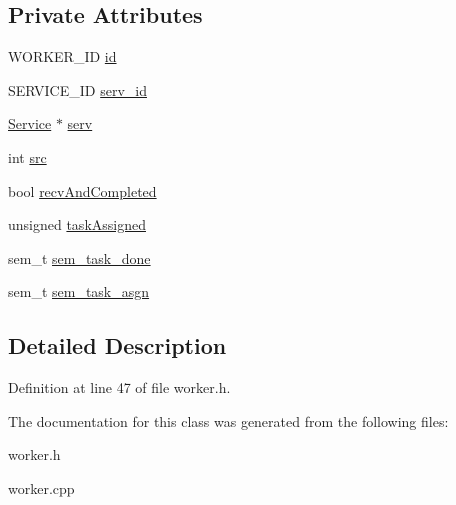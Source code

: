 \subsection*{Private Attributes}
\begin{CompactItemize}
\item 
\hypertarget{classWorker_b5ffcb995e12fa71b9551e91729d6972}{
WORKER\_\-ID \hyperlink{classWorker_b5ffcb995e12fa71b9551e91729d6972}{id}}
\label{classWorker_b5ffcb995e12fa71b9551e91729d6972}

\item 
\hypertarget{classWorker_d7dc76e301fd2bcf5d3a2088a59f1378}{
SERVICE\_\-ID \hyperlink{classWorker_d7dc76e301fd2bcf5d3a2088a59f1378}{serv\_\-id}}
\label{classWorker_d7dc76e301fd2bcf5d3a2088a59f1378}

\item 
\hypertarget{classWorker_454e1764ed165af733cc44a73e395692}{
\hyperlink{classService}{Service} $\ast$ \hyperlink{classWorker_454e1764ed165af733cc44a73e395692}{serv}}
\label{classWorker_454e1764ed165af733cc44a73e395692}

\item 
\hypertarget{classWorker_895c3ebc198018ea3391c09bc802d2f6}{
int \hyperlink{classWorker_895c3ebc198018ea3391c09bc802d2f6}{src}}
\label{classWorker_895c3ebc198018ea3391c09bc802d2f6}

\item 
\hypertarget{classWorker_1bcc1e66cc2021cc9cc5e79d0eea563d}{
bool \hyperlink{classWorker_1bcc1e66cc2021cc9cc5e79d0eea563d}{recv\-And\-Completed}}
\label{classWorker_1bcc1e66cc2021cc9cc5e79d0eea563d}

\item 
\hypertarget{classWorker_3bb2faa8e6350cb0ab13534069dcc96d}{
unsigned \hyperlink{classWorker_3bb2faa8e6350cb0ab13534069dcc96d}{task\-Assigned}}
\label{classWorker_3bb2faa8e6350cb0ab13534069dcc96d}

\item 
\hypertarget{classWorker_173ce84a3c7ee9f73c691c39c68ca711}{
sem\_\-t \hyperlink{classWorker_173ce84a3c7ee9f73c691c39c68ca711}{sem\_\-task\_\-done}}
\label{classWorker_173ce84a3c7ee9f73c691c39c68ca711}

\item 
\hypertarget{classWorker_995391e66dacedffe1e2b4754296b455}{
sem\_\-t \hyperlink{classWorker_995391e66dacedffe1e2b4754296b455}{sem\_\-task\_\-asgn}}
\label{classWorker_995391e66dacedffe1e2b4754296b455}

\end{CompactItemize}


\subsection{Detailed Description}




Definition at line 47 of file worker.h.

The documentation for this class was generated from the following files:\begin{CompactItemize}
\item 
worker.h\item 
worker.cpp\end{CompactItemize}
